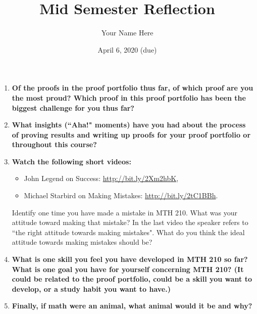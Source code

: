 \documentclass[11pt]{article}
\title{Mid Semester Reflection}
\author{Your Name Here}
\date{April 6, 2020 (due)}
\begin{document}
\maketitle

\begin{enumerate}

\item {\bf Of the proofs in the proof portfolio thus far, of which proof are you the most proud? Which proof in this proof portfolio has been the biggest challenge for you thus far?}
\vspace{.1in}


\vspace{.3in}




\item {\bf What insights (``Aha!" moments) have you had about the process of proving results and writing up proofs for your proof portfolio or throughout this course?}
\vspace{.1in}


\vspace{.3in}




\item {\bf Watch the following  short videos: 
	\begin{itemize}
	\item John Legend on Success: \url{http://bit.ly/2Xm2hbK},  
	\item Michael Starbird on Making Mistakes:  \url{http://bit.ly/2tC1BBh}. 
	\end{itemize}
Identify one time you have made a mistake in MTH 210. What was your attitude toward making that mistake? In the last video the speaker refers to ``the right attitude towards making mistakes". What do you think the ideal attitude towards making mistakes should be?}
\vspace{.1in}


\vspace{.3in}

\item {\bf What is one skill you feel you have developed in MTH 210 so far? What is one goal you have for yourself concerning MTH 210?  (It could be related to the proof portfolio, could be a skill you want to develop, or a study habit you want to have.)}
\vspace{.1in}


\vspace{.3in}

\item {\bf Finally, if math were an animal, what animal would it be and why?}


\end{enumerate}
\end{document}
